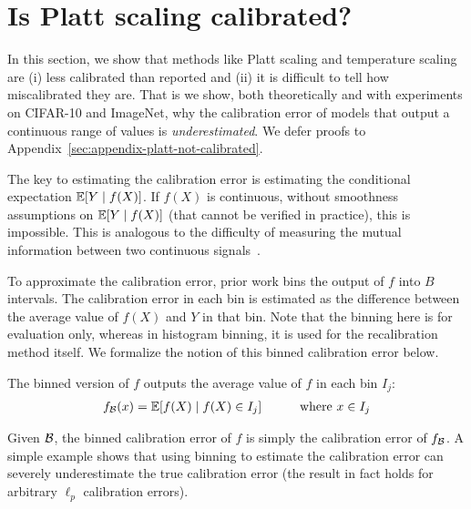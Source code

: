 \section{Is Platt scaling calibrated?}
\label{sec:challenges-measuring}

In this section, we show that methods like Platt scaling and temperature scaling are (i) less calibrated than reported and (ii) it is difficult to tell how miscalibrated they are. That is we show, both theoretically and with experiments on CIFAR-10 and ImageNet, why the calibration error of models that output a continuous range of values is \emph{underestimated}.
We defer proofs to Appendix~\ref{sec:appendix-platt-not-calibrated}.

The key to estimating the calibration error is estimating the conditional expectation $\mathbb{E}[Y \mid f(X)]$.  If $f(X)$ is continuous, without smoothness assumptions on $\mathbb{E}[Y \mid f(X)]$ (that cannot be verified in practice), this is impossible. This is analogous to the difficulty of measuring the mutual information between two continuous signals~\cite{paninski2003entropy}.

To approximate the calibration error, prior work bins the output of $f$ into $B$ intervals.
The calibration error in each bin is estimated as the difference between the average value of $f(X)$ and $Y$ in that bin.
Note that the binning here is for evaluation only, whereas in histogram binning, it is used for the recalibration method itself.
We formalize the notion of this binned calibration error below.

\begin{definition}
The binned version of $f$ outputs the average value of $f$ in each bin $I_j$:
\begin{align}
  f_{\mathcal{B}}(x) = \mathbb{E}[f(X) \mid f(X) \in I_j] \quad\quad\quad \mbox{where }x \in I_j
\end{align} 
\end{definition}

Given $\mathcal{B}{}$, the binned calibration error of $f$ is simply the calibration error of $f_{\mathcal{B}{}}$.
A simple example shows that using binning to estimate the calibration error can severely underestimate the true calibration error (the result in fact holds for arbitrary $\ell_p$ calibration errors).

\newcommand{\continuousNotCalibratedText}{
  For any binning scheme $\bins{}$, and continuous bijective function $f : [0, 1] \to [0, 1]$, there exists a distribution \pl{mathbb}$P$ over $\mathcal{X}, \mathcal{Y}$ s.t. $\ce(f_{\bins{}}) = 0$ but $\ce(f) \geq 0.49$.
Note that for all $f$, $0 \leq \ce(f) \leq 1$.
}

